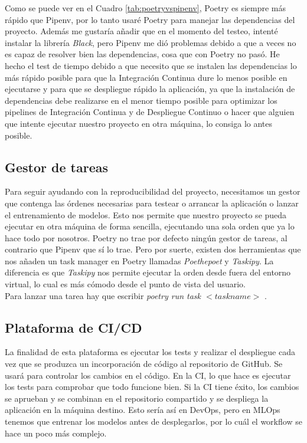 Como se puede ver en el Cuadro \ref{tab:poetryvspipenv}, Poetry es siempre más rápido que Pipenv, por lo tanto usaré Poetry para manejar las dependencias del proyecto. Además me gustaría añadir que en el momento del testeo, intenté instalar la librería \textit{Black}, pero Pipenv me dió problemas debido a que a veces no es capaz de resolver bien las dependencias, cosa que con Poetry no pasó. He hecho el test de tiempo debido a que necesito que se instalen las dependencias lo más rápido posible para que la Integración Continua dure lo menos posible en ejecutarse y para que se despliegue rápido la aplicación, ya que la instalación de dependencias debe realizarse en el menor tiempo posible para optimizar los pipelines de Integración Continua y de Despliegue Continuo o hacer que alguien que intente ejecutar nuestro proyecto en otra máquina, lo consiga lo antes posible.

\subsection{Gestor de tareas}

Para seguir ayudando con la reproducibilidad del proyecto, necesitamos un gestor que contenga las órdenes necesarias para testear o arrancar la aplicación o lanzar el entrenamiento de modelos. Esto nos permite que nuestro proyecto se pueda ejecutar en otra máquina de forma sencilla, ejecutando una sola orden que ya lo hace todo por nosotros. Poetry no trae por defecto ningún gestor de tareas, al contrario que Pipenv que sí lo trae. Pero por suerte, existen dos herramientas que nos añaden un task manager en Poetry llamadas \textit{Poethepoet} \cite{poethepoet} y \textit{Taskipy}\cite{taskipy}. La diferencia es que \textit{Taskipy} nos permite ejecutar la orden desde fuera del entorno virtual, lo cual es más cómodo desde el punto de vista del usuario.\\

Para lanzar una tarea hay que escribir \textit{poetry run task $<taskname>$} .

\subsection{Plataforma de CI/CD}

La finalidad de esta plataforma es ejecutar los tests y realizar el despliegue cada vez que se produzca un incorporación de código al repositorio de GitHub. Se usará para controlar los cambios en el código. En la CI, lo que hace es ejecutar los tests para comprobar que todo funcione bien. Si la CI tiene éxito, los cambios se aprueban y se combinan en el repositorio compartido y se despliega la aplicación en la máquina destino. Esto sería así en DevOps, pero en MLOps tenemos que entrenar los modelos antes de desplegarlos, por lo cuál el workflow se hace un poco más complejo.

